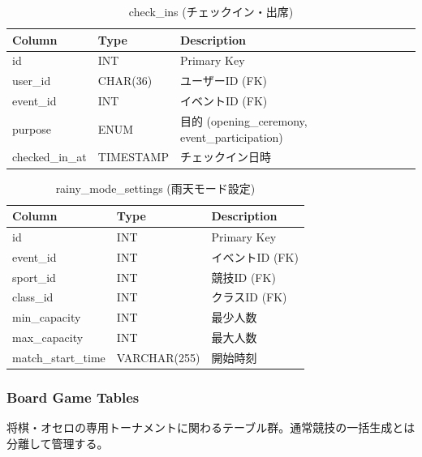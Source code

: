 \documentclass[paper=a4, fontsize=11pt]{jlreq}
\begin{document}
\begin{table}[H]
    \centering
    \caption{check\_ins (チェックイン・出席)}
    \begin{tabularx}{\textwidth}{|l|l|X|}
        \toprule
        Column & Type & Description \\
        \midrule
        id & INT & Primary Key \\
        user\_id & CHAR(36) & ユーザーID (FK) \\
        event\_id & INT & イベントID (FK) \\
        purpose & ENUM & 目的 (opening\_ceremony, event\_participation) \\
        checked\_in\_at & TIMESTAMP & チェックイン日時 \\
        \bottomrule
    \end{tabularx}
\end{table}

\begin{table}[H]
    \centering
    \caption{rainy\_mode\_settings (雨天モード設定)}
    \begin{tabularx}{\textwidth}{|l|l|X|}
        \toprule
        Column & Type & Description \\
        \midrule
        id & INT & Primary Key \\
        event\_id & INT & イベントID (FK) \\
        sport\_id & INT & 競技ID (FK) \\
        class\_id & INT & クラスID (FK) \\
        min\_capacity & INT & 最少人数 \\
        max\_capacity & INT & 最大人数 \\
        match\_start\_time & VARCHAR(255) & 開始時刻 \\
        \bottomrule
    \end{tabularx}
\end{table}

\subsubsection{Board Game Tables}
将棋・オセロの専用トーナメントに関わるテーブル群。通常競技の一括生成とは分離して管理する。
\end{document}
